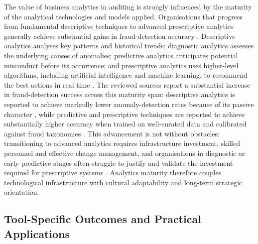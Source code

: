 \documentclass[preprint,12pt]{elsarticle}
\begin{document}
The value of business analytics in auditing is strongly influenced by the maturity of the analytical technologies and models applied. Organisations that progress from fundamental descriptive techniques to advanced prescriptive analytics generally achieve substantial gains in fraud-detection accuracy \citep{lokanan2024}. Descriptive analytics analyses key patterns and historical trends; diagnostic analytics assesses the underlying causes of anomalies; predictive analytics anticipates potential misconduct before its occurrence; and prescriptive analytics uses higher-level algorithms, including artificial intelligence and machine learning, to recommend the best actions in real time \citep{pamisetty2021}. The reviewed sources report a substantial increase in fraud-detection success across this maturity span: descriptive analytics is reported to achieve markedly lower anomaly-detection rates because of its passive character \citep{yv2021}, while predictive and prescriptive techniques are reported to achieve substantially higher accuracy when trained on well-curated data and calibrated against fraud taxonomies \citep{machireddy2022}. This advancement is not without obstacles: transitioning to advanced analytics requires infrastructure investment, skilled personnel and effective change management, and organisations in diagnostic or early predictive stages often struggle to justify and validate the investment required for prescriptive systems \citep{malempati2025}. Analytics maturity therefore couples technological infrastructure with cultural adaptability and long-term strategic orientation.

\subsection{Tool-Specific Outcomes and Practical Applications}
\end{document}
